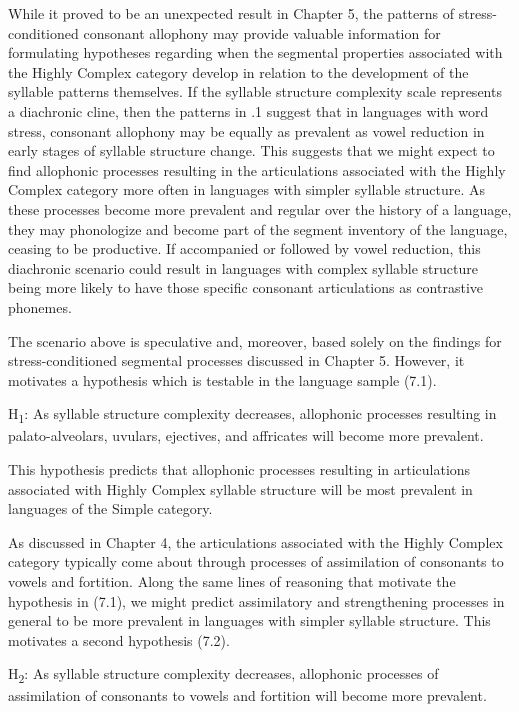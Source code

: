   While it proved to be an unexpected result in Chapter 5, the patterns of stress-conditioned consonant allophony may provide valuable information for formulating hypotheses regarding when the segmental properties associated with the Highly Complex category develop in relation to the development of the syllable patterns themselves. If the syllable structure complexity scale represents a diachronic cline, then the patterns in .1 suggest that in languages with word stress, consonant allophony may be equally as prevalent as vowel reduction in early stages of syllable structure change. This suggests that we might expect to find allophonic processes resulting in the articulations associated with the Highly Complex category more often in languages with simpler syllable structure. As these processes become more prevalent and regular over the history of a language, they may phonologize and become part of the segment inventory of the language, ceasing to be productive. If accompanied or followed by vowel reduction, this diachronic scenario could result in languages with complex syllable structure being more likely to have those specific consonant articulations as contrastive phonemes.

  The scenario above is speculative and, moreover, based solely on the findings for stress-conditioned segmental processes discussed in Chapter 5. However, it motivates a hypothesis which is testable in the language sample (7.1).

\ea\label{ex:(7.1)}
  H\textsubscript{1}: As syllable structure complexity decreases, allophonic processes resulting in palato-alveolars, uvulars, ejectives, and affricates will become more prevalent.
\z

This hypothesis predicts that allophonic processes resulting in articulations associated with Highly Complex syllable structure will be most prevalent in languages of the Simple category.

  As discussed in Chapter 4, the articulations associated with the Highly Complex category typically come about through processes of assimilation of consonants to vowels and fortition. Along the same lines of reasoning that motivate the hypothesis in (7.1), we might predict assimilatory and strengthening processes in general to be more prevalent in languages with simpler syllable structure. This motivates a second hypothesis (7.2).

\ea\label{ex:(7.2)}
  H\textsubscript{2}: As syllable structure complexity decreases, allophonic processes of assimilation of consonants to vowels and fortition will become more prevalent.
\z

